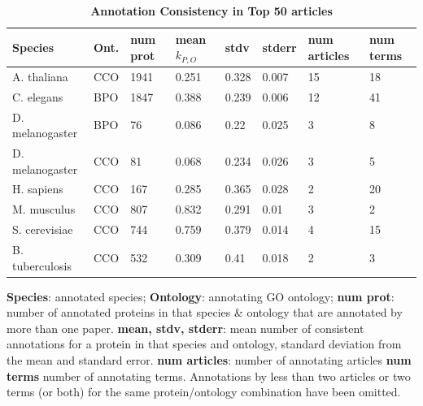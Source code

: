 \documentclass[12pt]{article}
\begin{document}
\begin{table}[!ht]
\caption{
\bf{Annotation Consistency in Top 50 articles}}
\begin{tabular}{|p{3cm}|l|l|l|l|l|p{1.5cm}|p{1.5cm}|}
\hline
\textbf{Species} & \textbf{Ont.} & \textbf{num prot} & \textbf{mean} 
$k_{P,O}$ &
\textbf{stdv} & \textbf{stderr} & \textbf{num articles} & \textbf{num terms} \\
\hline \hline
A. thaliana & CCO & 1941 & 0.251 & 0.328 & 0.007 & 15 & 18\\ \hline
C. elegans & BPO & 1847 & 0.388 & 0.239 & 0.006 & 12 & 41\\ \hline 
D. melanogaster & BPO & 76 & 0.086 & 0.22 & 0.025 & 3 & 8\\ \hline
D. melanogaster & CCO & 81 & 0.068 & 0.234 & 0.026 & 3 & 5\\ \hline
H. sapiens & CCO & 167 & 0.285 & 0.365 & 0.028 & 2 & 20\\ \hline
M. musculus & CCO & 807 & 0.832 & 0.291 & 0.01 & 3 & 2\\ \hline
S. cerevisiae & CCO & 744 & 0.759 & 0.379 & 0.014 & 4 & 15\\ \hline
B. tuberculosis & CCO & 532 & 0.309 & 0.41 & 0.018 & 2 & 3\\ \hline
\end{tabular}
\begin{flushleft}
\textbf{Species}: annotated species;
\textbf{Ontology}: annotating GO ontology;
\textbf{num prot}: number of annotated proteins in that species \& ontology that are annotated by
more than one paper.
\textbf{mean, stdv, stderr}: mean number of consistent annotations for a protein in that species
and ontology, standard deviation from the mean and standard error.
\textbf{num articles}: number of annotating articles
\textbf{num terms} number of annotating terms. 
Annotations by less than two articles or two terms (or both) for the same protein/ontology
combination have been omitted.
\end{flushleft}
\label{tab:dreamcatcher2}
\end{table}
\end{document}
